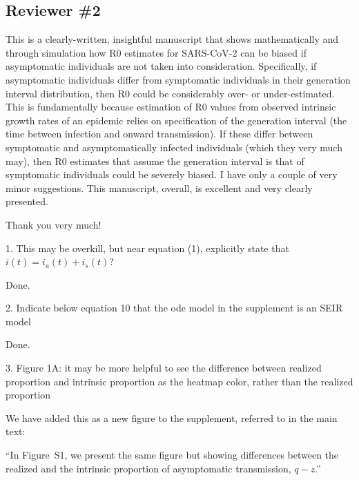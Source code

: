 \documentclass[12pt]{article}
\newcommand{\rev}{\subsection*}
\newcommand{\revtext}{\textsf}
\begin{document}
\rev{Reviewer \#2} 

\revtext{This is a clearly-written, insightful manuscript that shows mathematically and through simulation how R0 estimates for SARS-CoV-2 can be biased if asymptomatic individuals are not taken into consideration. Specifically, if asymptomatic individuals differ from symptomatic individuals in their generation interval distribution, then R0 could be considerably over- or under-estimated. This is fundamentally because estimation of R0 values from observed intrinsic growth rates of an epidemic relies on specification of the generation interval (the time between infection and onward transmission). If these differ between symptomatic and asymptomatically infected individuals (which they very much may), then R0 estimates that assume the generation interval is that of symptomatic individuals could be severely biased.
I have only a couple of very minor suggestions. This manuscript, overall, is excellent and very clearly presented.}

Thank you very much!

\revtext{1. This may be overkill, but near equation (1), explicitly state that $i(t) = i_a(t) + i_s(t)$?}

Done.

\revtext{2. Indicate below equation 10 that the ode model in the supplement is an SEIR model}

Done.

\revtext{3. Figure 1A: it may be more helpful to see the difference between realized proportion and intrinsic proportion as the heatmap color, rather than the realized proportion}

We have added this as a new figure to the supplement, referred to in the main text:

``In Figure~S1, we present the same figure but showing differences between the realized and the intrinsic proportion of asymptomatic transmission, $q-z$.''
\end{document}
